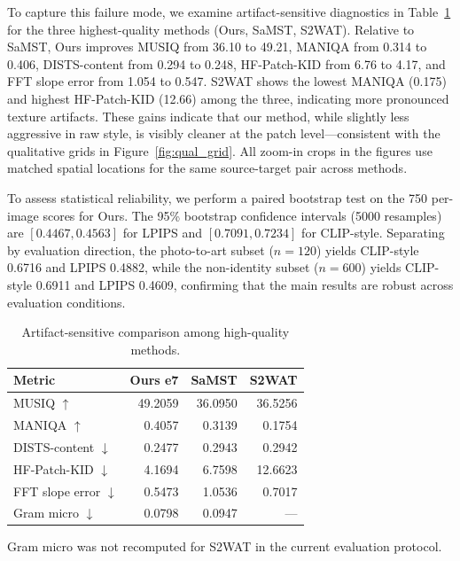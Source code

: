 ﻿\documentclass[letterpaper]{article}
\begin{document}
To capture this failure mode, we examine artifact-sensitive diagnostics in Table~\ref{tab:artifact} for the three highest-quality methods (Ours, SaMST, S2WAT). Relative to SaMST, Ours improves MUSIQ from 36.10 to 49.21, MANIQA from 0.314 to 0.406, DISTS-content from 0.294 to 0.248, HF-Patch-KID from 6.76 to 4.17, and FFT slope error from 1.054 to 0.547. S2WAT shows the lowest MANIQA (0.175) and highest HF-Patch-KID (12.66) among the three, indicating more pronounced texture artifacts. These gains indicate that our method, while slightly less aggressive in raw style, is visibly cleaner at the patch level---consistent with the qualitative grids in Figure~\ref{fig:qual_grid}. All zoom-in crops in the figures use matched spatial locations for the same source-target pair across methods.

To assess statistical reliability, we perform a paired bootstrap test on the 750 per-image scores for Ours. The 95\% bootstrap confidence intervals (5000 resamples) are $[0.4467, 0.4563]$ for LPIPS and $[0.7091, 0.7234]$ for CLIP-style. Separating by evaluation direction, the photo-to-art subset ($n=120$) yields CLIP-style 0.6716 and LPIPS 0.4882, while the non-identity subset ($n=600$) yields CLIP-style 0.6911 and LPIPS 0.4609, confirming that the main results are robust across evaluation conditions.

\begin{table}[t]
\centering
\caption{Artifact-sensitive comparison among high-quality methods.}
\label{tab:artifact}
\begin{tabular}{lrrr}
\toprule
Metric & Ours e7 & SaMST & S2WAT \\
\midrule
MUSIQ $\uparrow$ & 49.2059 & 36.0950 & 36.5256 \\
MANIQA $\uparrow$ & 0.4057 & 0.3139 & 0.1754 \\
DISTS-content $\downarrow$ & 0.2477 & 0.2943 & 0.2942 \\
HF-Patch-KID $\downarrow$ & 4.1694 & 6.7598 & 12.6623 \\
FFT slope error $\downarrow$ & 0.5473 & 1.0536 & 0.7017 \\
Gram micro $\downarrow$ & 0.0798 & 0.0947 & --- \\
\bottomrule
\end{tabular}
\smallskip
\footnoterule\small
Gram micro was not recomputed for S2WAT in the current evaluation protocol.
\end{table}
\end{document}
